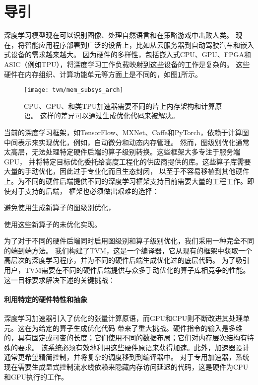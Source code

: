 \section{导引}
深度学习模型现在可以识别图像、处理自然语言和在策略游戏中击败人类。
现在，将智能应用程序部署到广泛的设备上，比如从云服务器到自动驾驶汽车和嵌入式设备的需求越来越大。
因为硬件的多样性，包括嵌入式CPU、GPU、FPGA和ASIC（例如TPU），将深度学习工作负载映射到这些设备的工作是复杂的。
这些硬件在内存组织、计算功能单元等方面上是不同的，如图\ref{fig:mem subsys arch}所示。

\begin{figure}[htbp]
    \centering
    \texttt{[image: tvm/mem\_subsys\_arch]}
    \caption{\label{fig:mem subsys arch}CPU、GPU、和类TPU加速器需要不同的片上内存架构和计算原语。
    这样的差异可以通过生成优化代码来被解决。}
\end{figure}

当前的深度学习框架，如TensorFlow、MXNet、Caffe和PyTorch，依赖于计算图中间表示来实现优化，例如，自动微分和动态内存管理。
然而，图级别优化通常太高层，无法处理特定硬件后端的算子级别转换。这些框架大多专注于服务端GPU，
并将特定目标优化委托给高度工程化的供应商提供的库。这些算子库需要大量的手动优化，因此过于专业化而且生态封闭，
以至于不容易移植到其他硬件上。为不同的硬件后端提供不同的深度学习框架支持目前需要大量的工程工作。即使对于支持的后端，
框架也必须做出艰难的选择：
\begin{enumerate*}
    \item 避免使用生成新算子的图级别优化，
    \item 使用这些新算子的未优化实现。
\end{enumerate*}

为了对于不同的硬件后端同时启用图级别和算子级别优化，我们采用一种完全不同的端到端方法。
我们构建了TVM，这是一个编译器，它从现有的框架中获取一个高层次的深度学习程序，并为不同的硬件后端生成优化过的底层代码。
为了吸引用户，TVM需要在不同的硬件后端提供与众多手动优化的算子库相竞争的性能。这一目标要求解决下述的关键挑战：

\paragraph{利用特定的硬件特性和抽象}
深度学习加速器引入了优化的张量计算原语，而GPU和CPU则不断改进其处理单元。这在为给定的算子生成优化代码
带来了重大挑战。硬件指令的输入是多维的，具有固定或可变的长度；它们使用不同的数据布局；它们对内存层次结构有特殊的要求。
该系统必须有效地利用这些硬件原语来获得加速。此外，加速器设计通常更希望精简控制，并将复杂的调度移到到编译器中。
对于专用加速器，系统现在需要生成显式控制流水线依赖来隐藏内存访问延迟的代码，这是硬件为CPU和GPU执行的工作。

